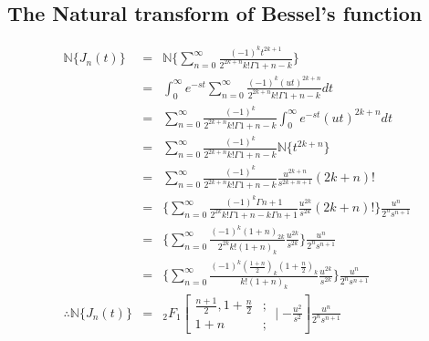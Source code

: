 \subsection{The Natural transform of Bessel's function}  
\begin{eqnarray*}
\mathbb{N}\lbrace J_{n}(t)\rbrace &=&  \mathbb{N}\lbrace{ \sum_{n=0}^{\infty} \frac{(-1)^{k}t^{2k+1}}{2^{2k+n}k!\Gamma{1+n-k}} }\rbrace\\
&=&\int_{0}^{\infty} e^{-st} \sum_{n=0}^{\infty} \frac{(-1)^{k}(ut)^{2k+n}}{2^{2k+n}k!\Gamma{1+n-k}}dt\\ 
  &=& \sum_{n=0}^{\infty} \frac{(-1)^{k}}{2^{2k+n}k!\Gamma{1+n-k}}\int_{0}^{\infty} e^{-st}(ut)^{2k+n}dt\\  
  &=& \sum_{n=0}^{\infty} \frac{(-1)^{k}}{2^{2k+n}k!\Gamma{1+n-k}}\mathbb{N} \lbrace t^{2k+n} \rbrace\\  
 &=& \sum_{n=0}^{\infty} \frac{(-1)^{k}}{2^{2k+n}k!\Gamma{1+n-k}}\frac{u^{2k+n}}{s^{2k+n+1}}(2k+n)!\\  
 &=&\lbrace \sum_{n=0}^{\infty} \frac{(-1)^{k}\Gamma{n+1}}{2^{2k}k!\Gamma{1+n-k}\Gamma{n+1}}\frac{u^{2k}}{s^{2k}}(2k+n)! \rbrace  \frac{u^{n}}{2^{n}s^{n+1}}\\ 
&=&\lbrace \sum_{n=0}^{\infty} \frac{(-1)^{k}(1+n)_{2k}}{2^{2k}k!(1+n)_{k}}\frac{u^{2k}}{s^{2k}}\rbrace  \frac{u^{n}}{2^{n}s^{n+1}}\\ 
 &=&\lbrace \sum_{n=0}^{\infty} \frac{(-1)^{k}(\frac{1+n}{2})_{k}(1+\frac{n}{2})_{k}}{k!(1+n)_{k}}\frac{u^{2k}}{s^{2k}}\rbrace  \frac{u^{n}}{2^{n}s^{n+1}}\\
  \therefore \mathbb{N}\lbrace J_{n}(t)\rbrace &=& {}_2 F_1\left[ \begin{array}{cc}
  \frac{n+1}{2},1+\frac{n}{2}&;\\
   1+n &; 
  \end{array}
 \mid{-\frac{u^2}{s^2}}
 \right]\frac{u^{n}}{2^{n}s^{n+1}} 
 \end{eqnarray*}
